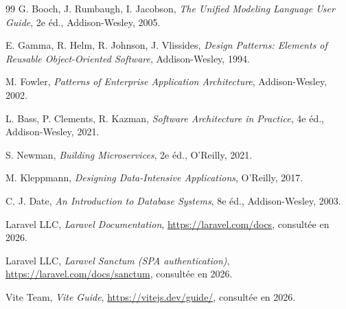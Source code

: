 \begin{thebibliography}{99}
G. Booch, J. Rumbaugh, I. Jacobson,
\emph{The Unified Modeling Language User Guide},
2e éd., Addison-Wesley, 2005.

E. Gamma, R. Helm, R. Johnson, J. Vlissides,
\emph{Design Patterns: Elements of Reusable Object-Oriented Software},
Addison-Wesley, 1994.

M. Fowler,
\emph{Patterns of Enterprise Application Architecture},
Addison-Wesley, 2002.

L. Bass, P. Clements, R. Kazman,
\emph{Software Architecture in Practice},
4e éd., Addison-Wesley, 2021.

S. Newman,
\emph{Building Microservices},
2e éd., O'Reilly, 2021.

M. Kleppmann,
\emph{Designing Data-Intensive Applications},
O'Reilly, 2017.

C. J. Date,
\emph{An Introduction to Database Systems},
8e éd., Addison-Wesley, 2003.

Laravel LLC,
\emph{Laravel Documentation},
\url{https://laravel.com/docs}, consultée en 2026.

Laravel LLC,
\emph{Laravel Sanctum (SPA authentication)},
\url{https://laravel.com/docs/sanctum}, consultée en 2026.

Vite Team,
\emph{Vite Guide},
\url{https://vitejs.dev/guide/}, consultée en 2026.

\end{thebibliography}
